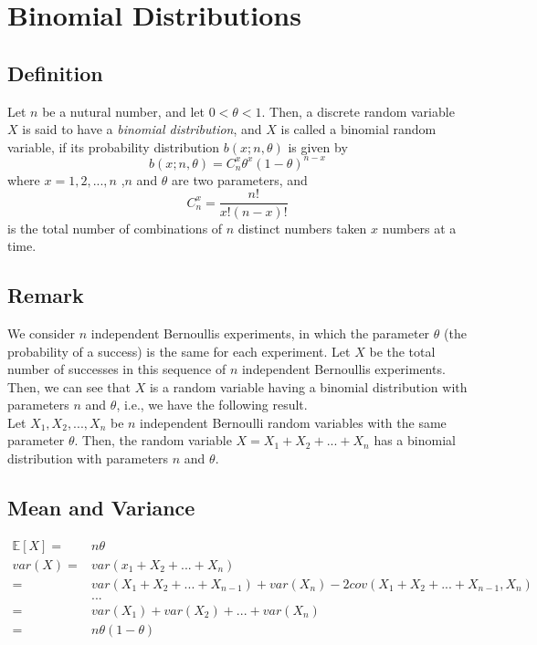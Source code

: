 \documentclass[titlepage]{article}
\begin{document}
    \section{Binomial Distributions}
        \subsection*{Definition}
            Let $n$ be a nutural number, and let $0<\theta<1$. Then, a discrete random variable $X$ is said to have a \textit{binomial distribution}, and $X$ is called a binomial random variable, if its probability distribution $b(x;n,\theta)$ is given by
            $$b(x;n,\theta)=C_n^x\theta^x(1-\theta)^{n-x}$$
            where $x=1,2,...,n$ ,$n$ and $\theta$ are two parameters, and 
            $$C_n^x=\frac{n!}{x!(n-x)!}$$
            is the total number of combinations of $n$ distinct numbers taken $x$ numbers at a time.
        \subsection*{Remark}
        We consider $n$ independent Bernoullis experiments, in
        which the parameter $\theta$ (the probability of a success) is the same
        for each experiment. Let $X$ be the total number of successes in
        this sequence of $n$ independent Bernoullis experiments. Then, we
        can see that $X$ is a random variable having a binomial distribution
        with parameters $n$ and $\theta$, i.e., we have the following result.
        \\
        Let $X_1,X_2,...,X_n$ be $n$ independent Bernoulli random variables with the same parameter $\theta$. Then, the random variable $X=X_1+X_2+...+X_n$ has a binomial distribution with parameters $n$ and $\theta$.
        \subsection*{Mean and Variance}
                \begin{equation*}
                    \begin{split}
                        \mathbb{E}[X]=&n\theta\\
                        var(X)=&var(x_1+X_2+...+X_n)\\
                            =&var(X_1+X_2+...+X_{n-1})+var(X_n)-2cov(X_1+X_2+...+X_{n-1},X_n)\\
                            &...\\
                            =&var(X_1)+var(X_2)+...+var(X_n)\\
                            =&n\theta(1-\theta)
                    \end{split}
                \end{equation*}
            
\end{document}
